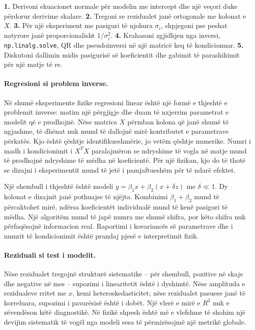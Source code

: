 \documentclass[12pt,a4paper,oneside]{book}
\begin{document}
\textbf{1.} Derivoni ekuacionet normale për modelin me intercept dhe një veçori duke përdorur derivime skalare. \textbf{2.} Tregoni se rezidualet janë ortogonale me kolonat e $X$. \textbf{3.} Për një eksperiment me pasiguri të njohura $\sigma_i$, shpjegoni pse peshat natyrore janë proporcionalisht $1/\sigma_i^2$. \textbf{4.} Krahasoni zgjidhjen nga inversi, \texttt{np.linalg.solve}, QR dhe pseudoinversi në një matricë keq të kondicionuar. \textbf{5.} Diskutoni dallimin midis pasigurisë së koeficientit dhe gabimit të parashikimit për një matje të re.


\paragraph{Regresioni si problem inverse.}
Në shumë eksperimente fizike regresioni linear është një formë e thjeshtë e problemit inverse: matim një përgjigje dhe duam të nxjerrim parametrat e modelit që e prodhojnë. Nëse matrica $X$ përmban kolona që janë shumë të ngjashme, të dhënat nuk mund të dallojnë mirë kontributet e parametrave përkatës. Kjo është çështje identifikueshmërie, jo vetëm çështje numerike. Numri i madh i kondicionimit i $X^TX$ paralajmëron se ndryshime të vogla në matje mund të prodhojnë ndryshime të mëdha në koeficientë. Për një fizikan, kjo do të thotë se dizajni i eksperimentit mund të jetë i pamjaftueshëm për të ndarë efektet.

Një shembull i thjeshtë është modeli $y=\beta_1x+\beta_2(x+\delta z)$ me $\delta\ll1$. Dy kolonat e dizajnit janë pothuajse të njëjta. Kombinimi $\beta_1+\beta_2$ mund të përcaktohet mirë, ndërsa koeficientët individualë mund të kenë pasiguri të mëdha. Një algoritëm mund të japë numra me shumë shifra, por këto shifra nuk përfaqësojnë informacion real. Raportimi i kovariancës së parametrave dhe i numrit të kondicionimit është prandaj pjesë e interpretimit fizik.

\paragraph{Reziduali si test i modelit.}
Nëse rezidualet tregojnë strukturë sistematike -- për shembull, pozitive në skaje dhe negative në mes -- supozimi i linearitetit është i dyshimtë. Nëse amplituda e rezidualeve rritet me $x$, kemi heteroskedasticitet; nëse rezidualet pasuese janë të korreluara, supozimi i pavarësisë është i dobët. Një vlerë e mirë e $R^2$ nuk e zëvendëson këtë diagnostikë. Në fizikë shpesh është më e vlefshme të shohim një devijim sistematik të vogël nga modeli sesa të përmirësojmë një metrikë globale.
\end{document}
